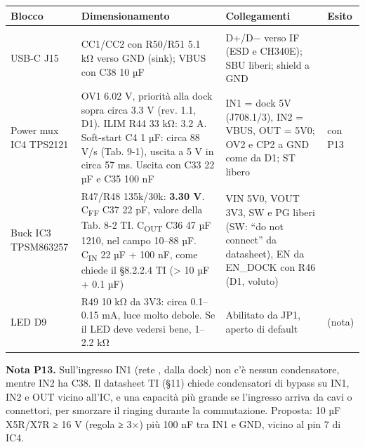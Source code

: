 {\footnotesize{}\setlength{\tabcolsep}{4pt}\renewcommand{\arraystretch}{1.1}
\begin{xltabular}{\linewidth}{>{\hsize\raggedright\arraybackslash}X>{\hsize\raggedright\arraybackslash}X>{\hsize\raggedright\arraybackslash}X>{\hsize\raggedright\arraybackslash}X}
\toprule
\textbf{Blocco} & \textbf{Dimensionamento} & \textbf{Collegamenti} & \textbf{Esito} \\
\midrule
\endhead
\midrule[0.15pt]\\\bottomrule\endfoot
\bottomrule\endlastfoot
USB-C J15 & CC1/\allowbreak{}CC2 con R50/\allowbreak{}R51 5.1 kΩ verso GND (sink); VBUS con C38 10 µF & D+/\allowbreak{}D− verso IF (ESD e CH340E); SBU liberi; shield a GND &  \\\midrule[0.15pt]
Power mux IC4 TPS2121 & OV1 6.02 V, priorità alla dock sopra circa 3.3 V (rev. 1.1, D1). ILIM R44 33 kΩ: 3.2 A. Soft-start C4 1 µF: circa 88 V/\allowbreak{}s (Tab. 9-1), uscita a 5 V in circa 57 ms. Uscita con C33 22 µF e C35 100 nF & IN1 = dock 5V (J708.1/\allowbreak{}3), IN2 = VBUS, OUT = 5V0; OV2 e CP2 a GND come da D1; ST libero &  con P13 \\\midrule[0.15pt]
Buck IC3 TPSM863257 & R47/\allowbreak{}R48 135k/\allowbreak{}30k: \textbf{3.30 V}. C\textsubscript{FF} C37 22 pF, valore della Tab. 8-2 TI. C\textsubscript{OUT} C36 47 µF 1210, nel campo 10–88 µF. C\textsubscript{IN} 22 µF + 100 nF, come chiede il §8.2.2.4 TI (> 10 µF + 0.1 µF) & VIN 5V0, VOUT 3V3, SW e PG liberi (SW: \textquotedblleft{}do not connect\textquotedblright{} da datasheet), EN da EN\_\allowbreak{}DOCK con R46 (D1, voluto) &  \\\midrule[0.15pt]
LED D9 & R49 10 kΩ da 3V3: circa 0.1–0.15 mA, luce molto debole. Se il LED deve vedersi bene, 1–2.2 kΩ & Abilitato da JP1, aperto di default &  (nota) \\
\end{xltabular}}

\textbf{Nota P13.} Sull'ingresso IN1 (rete , dalla dock) non c'è nessun condensatore, mentre IN2 ha C38. Il datasheet TI (§11) chiede condensatori di bypass su IN1, IN2 e OUT vicino all'IC, e una capacità più grande se l'ingresso arriva da cavi o connettori, per smorzare il ringing durante la commutazione. Proposta: 10 µF X5R/\allowbreak{}X7R ≥ 16 V (regola ≥ 3×) più 100 nF tra IN1 e GND, vicino al pin 7 di IC4.

